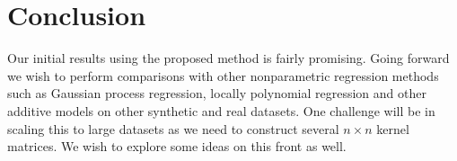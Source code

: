 
\section{Conclusion}
\label{sec:conclusion}

Our initial results using the proposed method is fairly promising.
Going forward we wish to perform comparisons with other nonparametric regression
methods such as Gaussian process regression, locally polynomial regression and
other additive models \citep{hastie90gam, ravikumar09spam,
duvenaud11additivegps} on other synthetic and real datasets.
One challenge will be in scaling this to large datasets as we need to construct
several $n\times n$ kernel matrices. We wish to explore some ideas on this front
as well.

